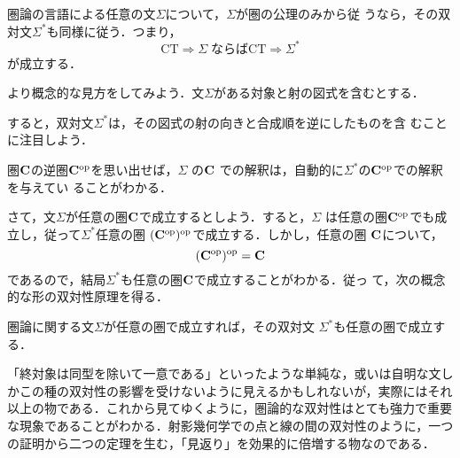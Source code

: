 \begin{prop}[形式的な双対性]
 圏論の言語による任意の文$\Sigma$について，$\Sigma$が圏の公理のみから従
 うなら，その双対文$\Sigma^*$も同様に従う．つまり，
 \[
  \mathrm{CT} \Rightarrow \Sigma \;\text{ならば}
  \mathrm{CT} \Rightarrow \Sigma^*
 \]
 が成立する．
\end{prop}

より概念的な見方をしてみよう．文$\Sigma$がある対象と射の図式を含むとする．
\begin{center}
\end{center}
すると，双対文$\Sigma^*$は，その図式の射の向きと合成順を逆にしたものを含
むことに注目しよう．
\begin{center}
\end{center}
圏${\bf C}$の逆圏${\bf C}^\mathrm{op}$を思い出せば，$\Sigma$ の${\bf C}$
での解釈は，自動的に$\Sigma^*$の${\bf C}^\mathrm{op}$での解釈を与えてい
ることがわかる．

さて，文$\Sigma$が任意の圏${\bf C}$で成立するとしよう．すると，$\Sigma$
は任意の圏${\bf C}^\mathrm{op}$でも成立し，従って$\Sigma^*$任意の圏
$({\bf C}^\mathrm{op})^{\mathrm{op}}$で成立する．しかし，任意の圏
${\bf C}$について，
\begin{equation}
  ({\bf C}^\mathrm{op})^{\mathrm{op}} = {\bf C}
\end{equation}
であるので，結局$\Sigma^*$も任意の圏${\bf C}$で成立することがわかる．従っ
て，次の概念的な形の双対性原理を得る．

\begin{prop}[概念的な双対性原理]
 圏論に関する文$\Sigma$が任意の圏で成立すれば，その双対文
 $\Sigma^*$も任意の圏で成立する．
\end{prop}

「終対象は同型を除いて一意である」といったような単純な，或いは自明な文し
かこの種の双対性の影響を受けないように見えるかもしれないが，実際にはそれ
以上の物である．これから見てゆくように，圏論的な双対性はとても強力で重要
な現象であることがわかる．射影幾何学での点と線の間の双対性のように，一つ
の証明から二つの定理を生む，「見返り」を効果的に倍増する物なのである．

